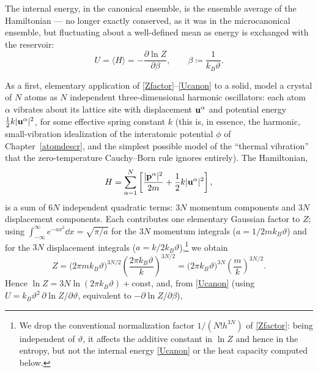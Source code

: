 The internal energy, in the canonical ensemble, is the ensemble average of the Hamiltonian --- no longer exactly conserved, as it was in the microcanonical ensemble, but fluctuating about a well-defined mean as energy is exchanged with the reservoir:
\begin{equation}\label{Ucanon}
	U = \langle H\rangle = -\frac{\partial \ln Z}{\partial\beta}, \qquad \beta\coloneqq\frac1{k_B\vartheta}.
\end{equation}

\begin{example}\label{ex:einstein}
	As a first, elementary application of \eqref{Zfactor}--\eqref{Ucanon} to a solid, model a crystal of $N$ atoms as $N$ independent three-dimensional harmonic oscillators: each atom $\alpha$ vibrates about its lattice site with displacement $\mathbf{u}^\alpha$ and potential energy $\tfrac12 k|\mathbf{u}^\alpha|^2$, for some effective spring constant $k$ (this is, in essence, the harmonic, small-vibration idealization of the interatomic potential $\phi$ of Chapter~\ref{atomdescr}, and the simplest possible model of the ``thermal vibration'' that the zero-temperature Cauchy--Born rule ignores entirely). The Hamiltonian,
	\begin{equation}
		H = \sum_{\alpha=1}^N\left[\frac{|\mathbf{p}^\alpha|^2}{2m}+\frac12 k|\mathbf{u}^\alpha|^2\right],
	\end{equation}
	is a sum of $6N$ independent quadratic terms: $3N$ momentum components and $3N$ displacement components. Each contributes one elementary Gaussian factor to $Z$; using $\int_{-\infty}^\infty e^{-ax^2}\dd x=\sqrt{\pi/a}$ for the $3N$ momentum integrals ($a=1/2mk_B\vartheta$) and for the $3N$ displacement integrals ($a=k/2k_B\vartheta$),\footnote{We drop the conventional normalization factor $1/(N!h^{3N})$ of \eqref{Zfactor}: being independent of $\vartheta$, it affects the additive constant in $\ln Z$ and hence in the entropy, but not the internal energy \eqref{Ucanon} or the heat capacity computed below.} we obtain
	\begin{equation}
		Z = \bigl(2\pi m k_B\vartheta\bigr)^{3N/2}\left(\frac{2\pi k_B\vartheta}{k}\right)^{3N/2} = \bigl(2\pi k_B\vartheta\bigr)^{3N}\left(\frac{m}{k}\right)^{3N/2}.
	\end{equation}
	Hence $\ln Z = 3N\ln(2\pi k_B\vartheta) + \text{const}$, and, from \eqref{Ucanon} (using $U=k_B\vartheta^2\,\partial\ln Z/\partial\vartheta$, equivalent to $-\partial\ln Z/\partial\beta$),
	\begin{equation}\label{einsteinU}

\end{equation}
\end{example}
